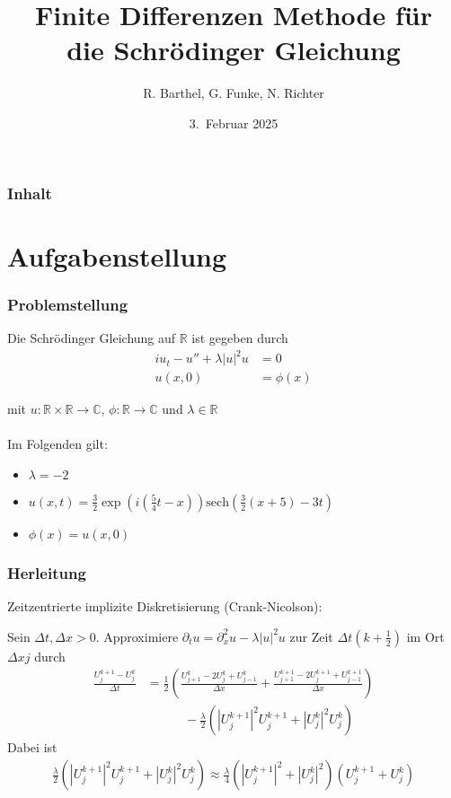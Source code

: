 \documentclass{beamer}
\author[Barthel, Funke, Richter]{R. Barthel, G. Funke, N. Richter}
\title[Finite Differenzen Methode f\"ur die Schr\"odinger Gleichung]{Finite Differenzen Methode f\"ur\\ die Schr\"odinger Gleichung}
\institute[Numerik-Praktikum 24/25]{Numerisches Praktikum\\
                    WS 2024/2025\\
                      Universit\"at Leipzig}
\date[WS 2025]{3.\ Februar 2025}
\begin{document}
\frame{\titlepage}

\begin{frame}
\frametitle{Inhalt}
\tableofcontents
\end{frame}

\section{Aufgabenstellung}

\begin{frame}
    \frametitle{Problemstellung}

    Die Schrödinger Gleichung auf $\mathbb{R}$ ist gegeben durch
    \begin{align*}
        iu_t - u'' + \lambda |u|^2u &= 0 \\
        u(x,0) &= \phi(x)
    \end{align*}
    
    mit $u:\mathbb{R}\times\mathbb{R}\to\mathbb{C}$, $\phi:\mathbb{R}\to\mathbb{C}$ und $\lambda\in\mathbb{R}$\\
    \ \\
    Im Folgenden gilt:
    \begin{itemize}
        \item $\lambda = -2$
        \item $u(x,t)=\frac{3}{2}\exp(i(\frac{5}{4}t-x))\text{sech}(\frac{3}{2}(x+5)-3t)$
        \item $\phi(x)=u(x,0)$
    \end{itemize}
\end{frame}


\begin{frame}
    \frametitle{Herleitung}

    Zeitzentrierte implizite Diskretisierung {\small(Crank-Nicolson)}:

    Sein $\Delta t, \Delta x>0$.
    Approximiere $\partial_t u = \partial_x^2 u - \lambda |u|^2u$ zur Zeit $\Delta t (k+\frac{1}{2})$ im Ort $\Delta x j$ durch
    \begin{align*}
        \frac{U^{k+1}_j-U^{k}_j}{\Delta t} &= \frac{1}{2}(\frac{U^{k}_{j+1}-2U^{k}_j+U^{k}_{j-1}}{\Delta x}+\frac{U^{k+1}_{j+1}-2U^{k+1}_j+U^{k+1}_{j-1}}{\Delta x})\\
        &\quad\qquad -\frac{\lambda}{2}(|U^{k+1}_j|^2U^{k+1}_j+|U^{k}_j|^2U^{k}_j)
    \end{align*}
    Dabei ist
    \begin{align*}
        \frac{\lambda}{2}(|U^{k+1}_j|^2U^{k+1}_j+|U^{k}_j|^2U^{k}_j) \approx \frac{\lambda}{4}(|U^{k+1}_j|^2+|U_j^k|^2)(U^{k+1}_j+U_j^k)
    \end{align*}
    

\end{frame}
\end{document}
